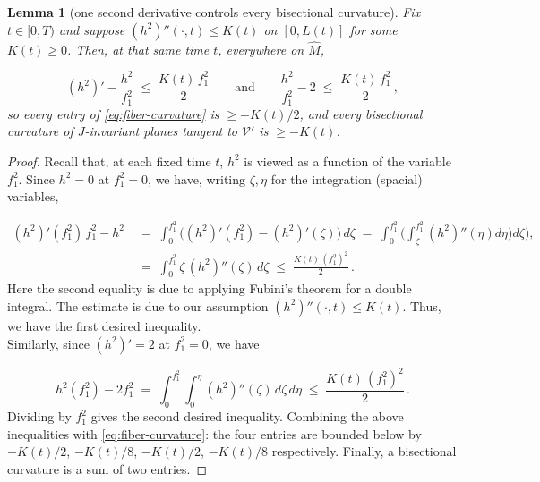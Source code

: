 \documentclass[11pt]{amsart}
\theoremstyle{plain}
\numberwithin{equation}{section}
\newtheorem{lemma}[theorem]{Lemma}
\theoremstyle{definition}
\theoremstyle{remark}
\begin{document}
\begin{lemma}[one second derivative controls every bisectional curvature]\label{lem:h2pp-controls-bisec}
	Fix $t \in [ 0, T )$ and suppose $( h^2 )'' ( \cdot, t ) \leq K (t)$ on $[ 0, L (t) ]$ for some $K (t) \geq 0$. Then, at that same time $t$, everywhere on $\widehat{M}$,
	
	\[
	( h^2 )' - \frac{h^2}{f_1^2} \;\leq\; \frac{K (t)\, f_1^2}{2} \qquad \text{and} \qquad \frac{h^2}{f_1^2} - 2 \;\leq\; \frac{K (t)\, f_1^2}{2} \,,
	\]
	so every entry of \eqref{eq:fiber-curvature} is $\geq - K (t) / 2$, and every bisectional curvature of $J$-invariant planes tangent to $\mathcal{V}'$ is $\geq - K (t)$.
	
\end{lemma}

\begin{proof}
	Recall that, at each fixed time $t$, $h^2$ is viewed as a function of the variable $f_1^2$. %
	Since $h^2 = 0$ at $f_1^2 = 0$, we have, writing $\zeta, \eta$ for the integration (spacial) variables,
	
	\begin{align*}
	( h^2 )'(f_1^2)\, f_1^2 - h^2 &\;=\; \int_0^{f_1^2} \Big( ( h^2 )' ( f_1^2 ) - ( h^2 )' ( \zeta ) \Big)\, d \zeta \;=\; \int_0^{f_1^2} \Big(\int_\zeta^{f_1^2} ( h^2 )''(\eta ) d\eta \Big) d \zeta),\\
	 &\;=\;\int_0^{f_1^2}\zeta\, ( h^2 )'' ( \zeta )\, d \zeta \;\leq\; \frac{K (t)\, ( f_1^2 )^2}{2} \,.
	\end{align*}
	Here the second equality is due to applying Fubini's theorem for a double integral. The estimate is due to our assumption  $( h^2 )'' ( \cdot, t ) \leq K (t)$. Thus, we have the first desired inequality. \\
	 
	Similarly, since $( h^2 )' = 2$ at $f_1^2 = 0$,	we have
	
	\[
	h^2(f_1^2) - 2 f_1^2 \;=\; \int_0^{f_1^2} \!\! \int_0^{\eta} ( h^2 )'' ( \zeta )\, d \zeta \, d \eta \;\leq\; \frac{K (t)\, ( f_1^2 )^2}{2} \,.
	\]
	Dividing by $f_1^2$ gives the second desired inequality. Combining the above inequalities with \eqref{eq:fiber-curvature}: the four entries are bounded below by $- K (t) / 2$, $- K (t) / 8$, $- K (t) / 2$, $- K (t) / 8$ respectively. Finally, a bisectional curvature is a sum of two entries.
\end{proof}
\end{document}
